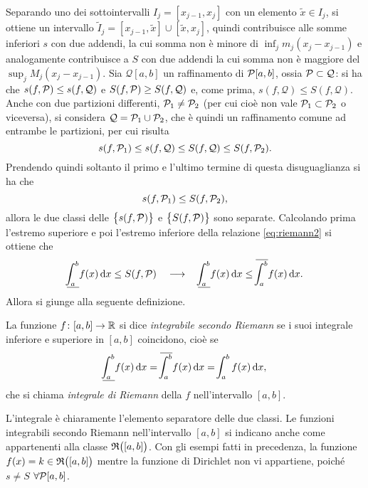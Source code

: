 Separando uno dei sottointervalli $I_j=[x_{j-1},x_j]$ con un elemento $\tilde{x}\in I_j$, si ottiene un intervallo $\tilde{I}_j=[x_{j-1},\tilde{x}]\cup[\tilde{x},x_j]$, quindi contribuisce alle somme inferiori $s$ con due addendi, la cui somma non è minore di $\inf_jm_j(x_j-x_{j-1})$ e analogamente contribuisce a $S$ con due addendi la cui somma non è maggiore del $\sup_jM_j(x_j-x_{j-1})$. %
Sia $\mathcal{Q}[a,b]$ un raffinamento di $\mathcal{P}[a,b]$, ossia $\mathcal{P}\subset\mathcal{Q}$: si ha che $s(f,\mathcal{P})\leq s(f,\mathcal{Q})$ e $S(f,\mathcal{P})\geq S(f,\mathcal{Q})$ e, come prima, $s(f,\mathcal{Q})\leq S(f,\mathcal{Q})$.
Anche con due partizioni differenti, $\mathcal{P}_1\neq\mathcal{P}_2$ (per cui cioè non vale $\mathcal{P}_1\subset\mathcal{P}_2$ o viceversa), si considera $\mathcal{Q}=\mathcal{P}_1\cup\mathcal{P}_2$, che è quindi un raffinamento comune ad entrambe le partizioni, per cui risulta
\[
s(f,\mathcal{P}_1)\leq s(f,\mathcal{Q})\leq S(f,\mathcal{Q})\leq S(f,\mathcal{P}_2).
\]
Prendendo quindi soltanto il primo e l'ultimo termine di questa disuguaglianza si ha che
\begin{equation} \label{eq:riemann2}
s(f,\mathcal{P}_1)\leq S(f,\mathcal{P}_2),
\end{equation}
allora le due classi delle $\big\{s(f,\mathcal{P})\big\}$ e $\big\{S(f,\mathcal{P})\big\}$ sono separate. Calcolando prima l'estremo superiore e poi l'estremo inferiore della relazione \eqref{eq:riemann2} si ottiene che
\[
\underline{\!\int_a^b} f(x)\,\textup{d} x\leq S(f,\mathcal{P})\quad\longrightarrow\quad\underline{\!\int_a^b} f(x)\,\textup{d} x\leq\overline{\!\int_a^b} f(x)\,\textup{d} x.
\]
Allora si giunge alla seguente definizione.
\begin{definizione} \label{d:riemann}
La funzione $f\colon[a,b]\to\mathbb{R}$ si dice \emph{integrabile secondo Riemann} se i suoi integrale inferiore e superiore in $[a,b]$ coincidono, cioè se
\[
\underline{\!\int_a^b} f(x)\,\textup{d} x=\overline{\!\int_a^b} f(x)\,\textup{d} x=\!\int_a^bf(x)\,\textup{d} x,
\]
che si chiama \emph{integrale di Riemann} della $f$ nell'intervallo $[a,b]$.
\end{definizione}
L'integrale è chiaramente l'elemento separatore delle due classi. Le funzioni integrabili secondo Riemann nell'intervallo $[a,b]$ si indicano anche come appartenenti alla classe $\mathfrak{R}\big([a,b]\big)$.
Con gli esempi fatti in precedenza, la funzione $f(x)=k\in\mathfrak{R}\big([a,b]\big)$ mentre la funzione di Dirichlet non vi appartiene, poiché $s\neq S$ $\forall\mathcal{P}[a,b]$.

